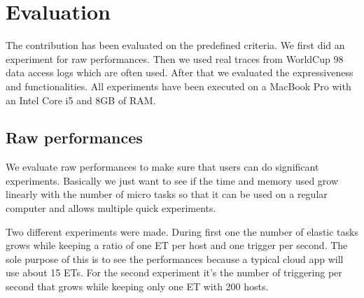\documentclass[a4paper, onecolumn, 11pt]{article}
\begin{document}
\section{Evaluation} \label{eval}
  The contribution has been evaluated on the predefined criteria. We first did 
  an experiment for raw performances. Then we used real traces from WorldCup 98 
  data access logs \cite{wc98} which are often used. After that we evaluated 
  the expressiveness and functionalities. All experiments have been executed on 
  a MacBook Pro with an Intel Core i5 and 8GB of RAM.
    
  \subsection{Raw performances} \label{raw_perf}
    We evaluate raw performances to make sure that users can do significant 
    experiments. Basically we just want to see if the time and memory used grow 
    linearly with the number of micro tasks so that it can be used on a regular 
    computer and allows multiple quick experiments.
  
  	Two different experiments were made. During first one the number of elastic 
  	tasks grows while keeping a ratio of one ET per host and one trigger per 
  	second. The sole purpose of this is to see the performances because a 
  	typical cloud app will use about 15 ETs. For the second experiment it's the 
  	number of triggering per second that grows while keeping only one ET with 
  	200 hosts.
    
\end{document}

